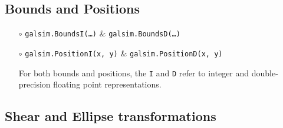 \documentclass[preprint,11pt]{aastex}
\begin{document}
\subsection{Bounds and Positions}\label{sect:bounds}

\begin{itemize}

\item[$\circ$] \texttt{galsim.BoundsI(\dots)} \&
  \texttt{galsim.BoundsD(\dots)} 

\item[$\circ$] \texttt{galsim.PositionI(x, y)} \&
  \texttt{galsim.PositionD(x, y)} 

For both bounds and positions, the \texttt{I} and \texttt{D} refer to
integer and double-precision floating point representations.

\end{itemize}

\subsection{Shear and Ellipse transformations}\label{sect:shears}
\end{document}
